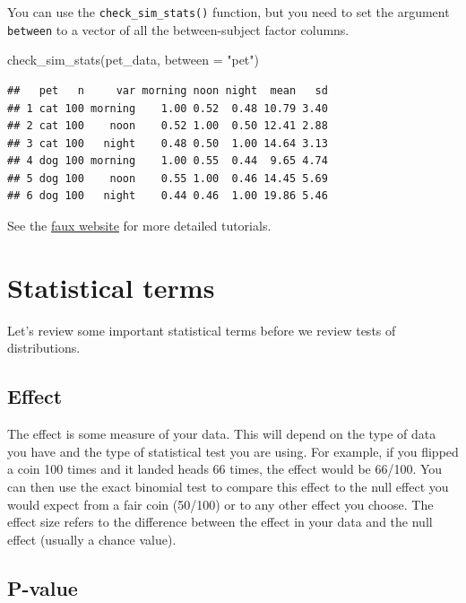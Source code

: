 \documentclass[
  oneside]{book}
\newenvironment{Shaded}{\begin{snugshade}}{\end{snugshade}}
\newcommand{\AttributeTok}[1]{\textcolor[rgb]{0.77,0.63,0.00}{#1}}
\newcommand{\FunctionTok}[1]{\textcolor[rgb]{0.00,0.00,0.00}{#1}}
\newcommand{\NormalTok}[1]{#1}
\newcommand{\StringTok}[1]{\textcolor[rgb]{0.31,0.60,0.02}{#1}}
\begin{document}
You can use the \texttt{check\_sim\_stats()} function, but you need to set the argument \texttt{between} to a vector of all the between-subject factor columns.

\begin{Shaded}
\begin{Highlighting}[]
\FunctionTok{check\_sim\_stats}\NormalTok{(pet\_data, }\AttributeTok{between =} \StringTok{"pet"}\NormalTok{)}
\end{Highlighting}
\end{Shaded}

\begin{verbatim}
##   pet   n     var morning noon night  mean   sd
## 1 cat 100 morning    1.00 0.52  0.48 10.79 3.40
## 2 cat 100    noon    0.52 1.00  0.50 12.41 2.88
## 3 cat 100   night    0.48 0.50  1.00 14.64 3.13
## 4 dog 100 morning    1.00 0.55  0.44  9.65 4.74
## 5 dog 100    noon    0.55 1.00  0.46 14.45 5.69
## 6 dog 100   night    0.44 0.46  1.00 19.86 5.46
\end{verbatim}

See the \href{https://debruine.github.io/faux/}{faux website} for more detailed tutorials.

\hypertarget{stat-terms}{%
\section{Statistical terms}\label{stat-terms}}

Let's review some important statistical terms before we review tests of distributions.

\hypertarget{effect}{%
\subsection{Effect}\label{effect}}

The effect is some measure of your data. This will depend on the type of data you have and the type of statistical test you are using. For example, if you flipped a coin 100 times and it landed heads 66 times, the effect would be 66/100. You can then use the exact binomial test to compare this effect to the null effect you would expect from a fair coin (50/100) or to any other effect you choose. The effect size refers to the difference between the effect in your data and the null effect (usually a chance value).

\hypertarget{p-value}{%
\subsection{P-value}\label{p-value}}
\end{document}
